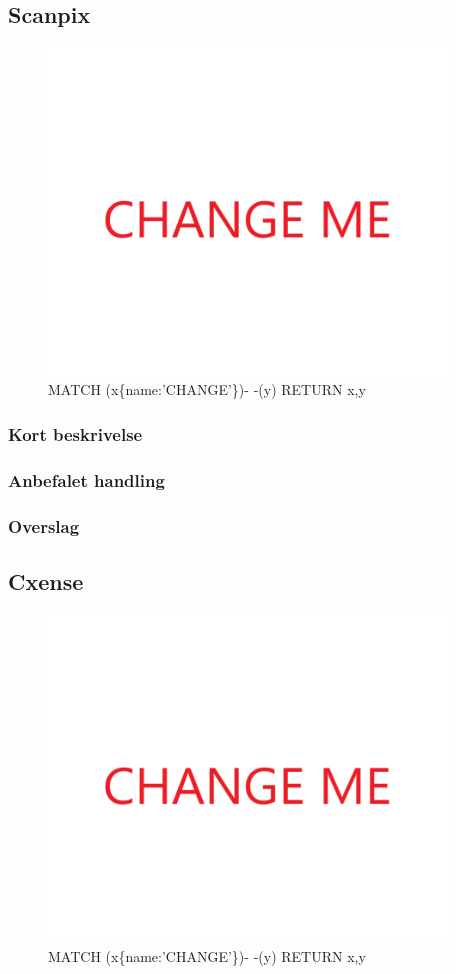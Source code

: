 \documentclass{article}
\begin{document}
\subsection{Scanpix}
\begin{figure}[h]
\includegraphics[width=300pt]{CHANGE.PNG}
\caption{MATCH (x\{name:'CHANGE'\})- -(y) RETURN x,y}
\end{figure}
\subsubsection{Kort beskrivelse}
\subsubsection{Anbefalet handling}
\subsubsection{Overslag}
\subsection{Cxense}
\begin{figure}[h]
\includegraphics[width=300pt]{CHANGE.PNG}
\caption{MATCH (x\{name:'CHANGE'\})- -(y) RETURN x,y}
\end{figure}
\end{document}

